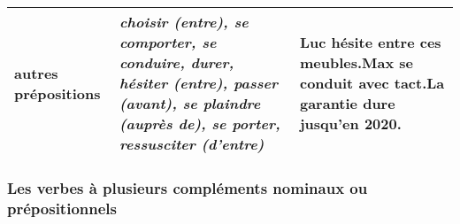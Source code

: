 \documentclass[UTF8]{report}
\begin{document}
\begin{table}[H]
\begin{tabularx}{\textwidth}{|l|X|X|}
    \hline
    autres prépositions & \textit{choisir (entre), se comporter, se conduire, durer, hésiter (entre), passer (avant), se plaindre (auprès de), se porter, ressusciter (d'entre)}
    & Luc hésite {entre ces meubles}.\newline Max se conduit {avec tact}.\newline La garantie dure {jusqu'en 2020}. \\
    \hline
    \end{tabularx}
\end{table}

\subsubsection{Les verbes à plusieurs compléments nominaux ou prépositionnels}
\end{document}
